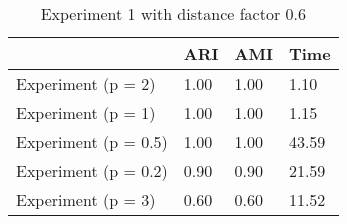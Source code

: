 \begin{table}
\centering
\caption{Experiment 1 with distance factor 0.6}
\begin{tabular}{llll}
\toprule
{} &   ARI &   AMI &   Time \\
\midrule
Experiment (p = 2)   &  1.00 &  1.00 &   1.10 \\
Experiment (p = 1)   &  1.00 &  1.00 &   1.15 \\
Experiment (p = 0.5) &  1.00 &  1.00 &  43.59 \\
Experiment (p = 0.2) &  0.90 &  0.90 &  21.59 \\
Experiment (p = 3)   &  0.60 &  0.60 &  11.52 \\
\bottomrule
\end{tabular}
\end{table}
